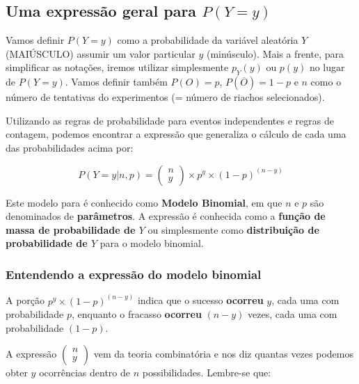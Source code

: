 \documentclass[
]{book}
\begin{document}
\hypertarget{uma-expressuxe3o-geral-para-py-y}{%
\subsection*{\texorpdfstring{Uma expressão geral para \(P(Y = y)\)}{Uma expressão geral para P(Y = y)}}\label{uma-expressuxe3o-geral-para-py-y}}

Vamos definir \(P(Y = y)\) como a probabilidade da variável aleatória \(Y\) (MAIÚSCULO) assumir um valor particular \(y\) (minúsculo). Mais a frente, para simplificar as notações, iremos utilizar simplesmente \(p_{Y}(y)\) ou \(p(y)\) no lugar de \(P(Y = y)\). Vamos definir também \(P(O) = p\), \(P(\overline{O}) = 1 - p\) e \(n\) como o número de tentativas do experimentos (= número de riachos selecionados).

Utilizando as regras de probabilidade para eventos independentes e regras de contagem, podemos encontrar a expressão que generaliza o cálculo de cada uma das probabilidades acima por:

\[P(Y = y|n,p) = \left (\begin{array}{c}
n \\
y
\end{array}\right) \times p^y \times (1-p)^{(n-y)}\]

Este modelo para é conhecido como \textbf{Modelo Binomial}, em que \(n\) e \(p\) são denominados de \textbf{parâmetros}. A expressão é conhecida como a \textbf{função de massa de probabilidade de \(Y\)} ou simplesmente como \textbf{distribuição de probabilidade de \(Y\)} para o modelo binomial.

\hypertarget{entendendo-a-expressuxe3o-do-modelo-binomial}{%
\subsubsection*{Entendendo a expressão do modelo binomial}\label{entendendo-a-expressuxe3o-do-modelo-binomial}}

A porção \(p^y \times (1-p)^{(n-y)}\) indica que o sucesso \textbf{ocorreu} \(y\), cada uma com probabilidade \(p\), enquanto o fracasso \textbf{ocorreu} \((n - y)\) vezes, cada uma com probabilidade \((1-p)\).

A expressão \(\left (\begin{array}{c} n \\ y \end{array}\right)\) vem da teoria combinatória e nos diz quantas vezes podemos obter \(y\) ocorrências dentro de \(n\) possibilidades. Lembre-se que:
\end{document}
